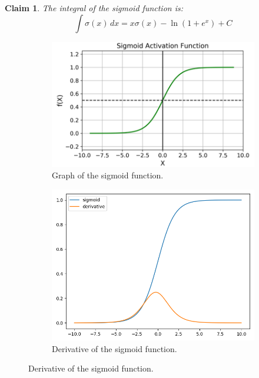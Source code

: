 \documentclass[11pt]{book} %
\newtheorem*{claim*}{Claim}
\begin{document}
\begin {claim*}
    The integral of the sigmoid function is:
    \begin{equation}
        \int \sigma(x) \, dx = x \sigma(x) - \ln(1 + e^x) + C
    \end{equation}
\end{claim*}

\begin{figure}[h]
    \begin{subfigure}{0.5\textwidth}
        \centering
        \includegraphics[width=\linewidth]{Figs/sigmoid.png}
        \caption{Graph of the sigmoid function.}
        \label{fig:sigmoid}
    \end{subfigure}
    \begin{subfigure}{0.5\textwidth}
        \centering
        \includegraphics[width=\linewidth]{Figs/sigmoid_der.png}
        \caption{Derivative of the sigmoid function.}
        \label{fig:sigmoid_derivative}
    \end{subfigure}
\end{figure}
\end{document}
